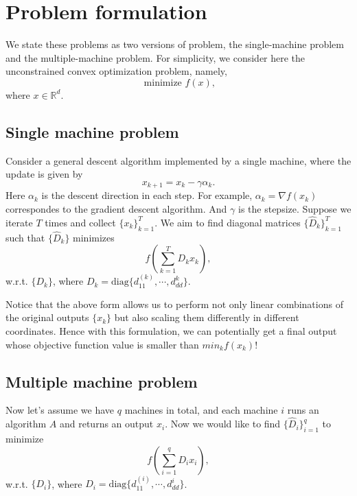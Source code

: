 \documentclass{article}
\def\real{\mathbb R}
\begin{document}
\section{Problem formulation}
\label{sec:problem_formulation}
We state these problems as two versions of problem, the single-machine problem and the multiple-machine problem. For simplicity, we consider here the unconstrained convex optimization problem, namely,
\begin{equation}
  \label{eq:optimization}
\mbox{ minimize } f(x),
\end{equation}
where $x \in \real^{d}$.

\subsection{Single machine problem}
Consider a general descent algorithm implemented by a single machine, where the update is given by
\[
  x_{k+1} = x_k - \gamma \alpha_k.
\]
Here $\alpha_k$ is the descent direction in each step. For example, $\alpha_k = \nabla f(x_k)$ correspondes to the gradient descent algorithm. And $\gamma$ is the stepsize. Suppose we iterate $T$ times and collect $\{x_k\}_{k=1}^T$. We aim to find diagonal matrices $\{\hat D_k\}_{k=1}^T$ such that $\{\hat D_k\}$ minimizes
\begin{equation}
  \label{eq:obj1}
  f(\sum_{k=1}^T D_k x_k),
\end{equation}
w.r.t. $\{D_k\}$, where $D_k = \mbox{diag}\{d^{(k)}_{11}, \cdots, d^{k}_{dd}\}$.

Notice that the above form allows us to perform not only linear combinations of the original outputs $\{x_k\}$ but also scaling them differently in different coordinates. Hence with this formulation, we can potentially get a final output whose objective function value is smaller than $min_k f(x_k)$!

\subsection{Multiple machine problem}
Now let's assume we have $q$ machines in total, and each machine $i$ runs an algorithm $A$ and returns an output $x_i$. Now we would like to find $\{ \hat D_i\}_{i=1}^q$ to minimize
\begin{equation}
  \label{eq:obj2}
  f(\sum_{i=1}^q D_i x_i),
\end{equation}
w.r.t. $\{D_i\}$, where $D_i = \mbox{diag}\{d^{(i)}_{11}, \cdots, d^{i}_{dd}\}$.
\end{document}

